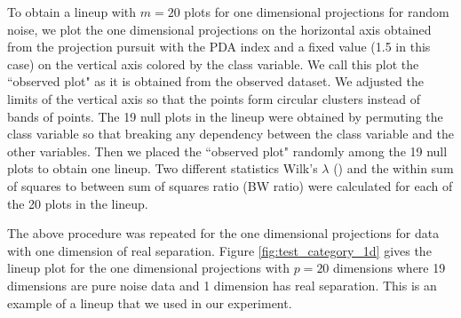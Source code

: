 \documentclass[12]{article}
\begin{document}
To obtain a lineup with $m = 20$ plots for one dimensional projections for random noise, we plot the one dimensional projections on the horizontal axis obtained from the projection pursuit with the PDA index and a fixed value (1.5 in this case) on the vertical axis colored by the class variable. We call this plot the ``observed plot" as it is obtained from the observed dataset. We adjusted the limits of the vertical axis so that the points form circular clusters instead of bands of points. The 19 null plots in the lineup were obtained by  permuting the class variable so that breaking any dependency between the class variable and the other variables. Then we placed the ``observed plot" randomly among the 19 null plots to obtain one lineup. Two different statistics Wilk's $\lambda$ (\cite{JW02})  and the within sum of squares to between sum of squares ratio (BW ratio) were calculated for each of the 20 plots in the lineup. 

The above procedure was repeated for the one dimensional projections for data with one dimension of real separation. Figure \ref{fig:test_category_1d} gives the lineup plot for the one dimensional projections with $p = 20$ dimensions where 19 dimensions are pure noise data and 1 dimension has real separation. This is an example of a lineup that we used in our experiment. 

\end{document}

